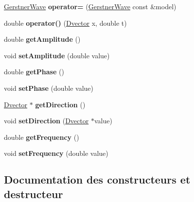 \begin{DoxyCompactItemize}
\item 
\mbox{\label{class_gerstner_wave_ae776ca443eb1bf78bcb296686ccf27ae}} 
\hyperlink{class_gerstner_wave}{Gerstner\+Wave} {\bfseries operator=} (\hyperlink{class_gerstner_wave}{Gerstner\+Wave} const \&model)
\item 
\mbox{\label{class_gerstner_wave_a126224a6c8d1343b07e5b1d304bad7cd}} 
double {\bfseries operator()} (\hyperlink{class_dvector}{Dvector} x, double t)
\item 
\mbox{\label{class_gerstner_wave_a4b3989096ad666a3daf18c9e61a33818}} 
double {\bfseries get\+Amplitude} ()
\item 
\mbox{\label{class_gerstner_wave_a3b499d792884b962fadfd58b3003c2c2}} 
void {\bfseries set\+Amplitude} (double value)
\item 
\mbox{\label{class_gerstner_wave_aec45e17327906cf1aa7e746a5cd92596}} 
double {\bfseries get\+Phase} ()
\item 
\mbox{\label{class_gerstner_wave_a4e5a1f7f408d79bb2eab24cdfa5cdf08}} 
void {\bfseries set\+Phase} (double value)
\item 
\mbox{\label{class_gerstner_wave_ade0e4f9a29e27253a7096cf37dcd52d6}} 
\hyperlink{class_dvector}{Dvector} $\ast$ {\bfseries get\+Direction} ()
\item 
\mbox{\label{class_gerstner_wave_a722535521e43ba6f6c5e28a578ee824b}} 
void {\bfseries set\+Direction} (\hyperlink{class_dvector}{Dvector} $\ast$value)
\item 
\mbox{\label{class_gerstner_wave_a254b842667e2a2c6ce10f0f7b965c458}} 
double {\bfseries get\+Frequency} ()
\item 
\mbox{\label{class_gerstner_wave_a7ea4b613d091da359115183c43ddeb2a}} 
void {\bfseries set\+Frequency} (double value)
\end{DoxyCompactItemize}


\subsection{Documentation des constructeurs et destructeur}
\mbox{\label{class_gerstner_wave_aca3a91ab8ae49e3814bfd5b6e4607f31}} 
